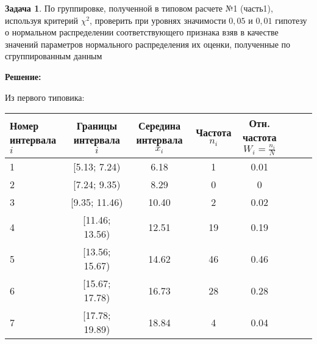 \documentclass[a4paper,11pt]{article}
\newenvironment{shdd}{\begin{mdframed}[backgroundcolor=shadecolor]}{\end{mdframed}}
\theoremstyle{definition}
\newtheorem{problem}{Задача}\setlength{\parindent}{0pt}
\newenvironment{solution}
{\begin{shdd}
     \textbf{Решение:}\par\setlength{\parindent}{0pt}}
     {
\end{shdd}}
\begin{document}
    \vspace{10pt}
    \begin{problem}
        По группировке, полученной в типовом расчете №1 (часть1), используя критерий \(\chi^2\),
        проверить при уровнях значимости \(0,05\) и \(0,01\) гипотезу о нормальном распределении
        соответствующего признака взяв в качестве значений параметров нормального распределения
        их оценки, полученные по сгруппированным данным

        \begin{solution}
            Из первого типовика:
            \begin{table}[H]
                \centering
                \begin{adjustbox}{max width=\textwidth}
                    \begin{tabular}{l c c c c c c c}
                        \toprule
                        \makecell{Номер \\интервала \( i \)} &
                        \makecell{Границы \\ интервала \( i \)} &
                        \makecell{Середина \\интервала \( x_i \)} &
                        \makecell{Частота \\\( n_i \)} &
                        \makecell{Отн. частота \\\( W_i = \frac{n_i}{N} \)} \\
                        \midrule
                        1 & [5.13; 7.24)   & 6.18  & 1  & 0.01    \\
                        2 & [7.24; 9.35)  & 8.29 & 0  & 0 \\
                        3 & [9.35; 11.46) & 10.40 & 2 & 0.02 \\
                        4 & [11.46; 13.56) & 12.51 & 19 & 0.19 \\
                        5 & [13.56; 15.67) & 14.62 & 46 & 0.46 \\
                        6 & [15.67; 17.78) & 16.73 & 28  & 0.28 \\
                        7 & [17.78; 19.89) & 18.84 & 4  & 0.04 \\
                        \bottomrule
                    \end{tabular}
                \end{adjustbox}\label{tab:table2}
            \end{table}


\end{solution}
\end{problem}
\end{document}
